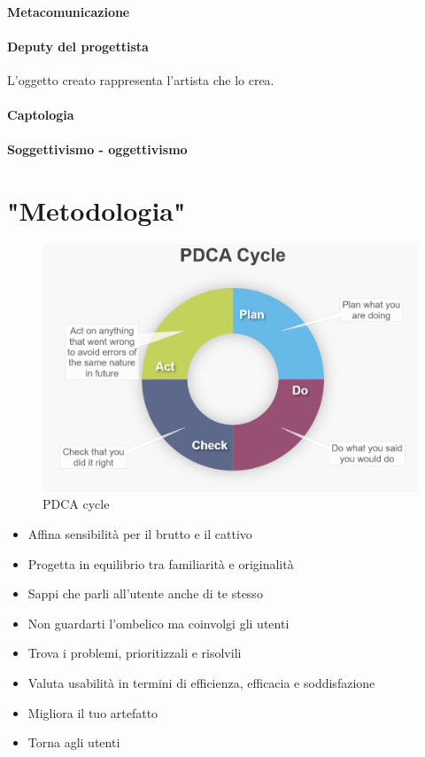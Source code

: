 \documentclass[11pt,a4paper]{book}
\begin{document}
\paragraph{Metacomunicazione}


\paragraph{Deputy del progettista}
L'oggetto creato rappresenta l'artista che lo crea.

\paragraph{Captologia}


\paragraph{Soggettivismo - oggettivismo}


\section{"Metodologia"}
\begin{figure}[h!]
	\begin{center}
		\includegraphics[scale=0.4]{img/011.png}
		\caption{PDCA cycle}
		\label{fig: 011}
	\end{center}
\end{figure}
\begin{itemize}
	\item Affina sensibilità per il brutto e il cattivo
	\item Progetta in equilibrio tra familiarità e originalità
	\item Sappi che parli all'utente anche di te stesso
	\item Non guardarti l'ombelico ma coinvolgi gli utenti
	\item Trova i problemi, prioritizzali e risolvili
	\item Valuta usabilità in termini di efficienza, efficacia e soddisfazione
	\item Migliora il tuo artefatto
	\item Torna agli utenti
\end{itemize}
\end{document}
